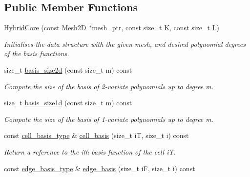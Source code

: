 \subsection*{Public Member Functions}
\begin{DoxyCompactItemize}
\item 
\hyperlink{classHArDCore2D_1_1HybridCore_a77e1aad579b2b484f068790d546a8d77}{Hybrid\+Core} (const \hyperlink{classHArDCore2D_1_1Mesh2D}{Mesh2D} $\ast$mesh\+\_\+ptr, const size\+\_\+t \hyperlink{classHArDCore2D_1_1HybridCore_a74242d0a8b68fe5d9a35c6eb0effe3b2}{K}, const size\+\_\+t \hyperlink{classHArDCore2D_1_1HybridCore_af5aea2e23e91c582d8c8189a5bc7ae96}{L})
\begin{DoxyCompactList}\small\item\em Initialises the data structure with the given mesh, and desired polynomial degrees of the basis functions. \end{DoxyCompactList}\item 
size\+\_\+t \hyperlink{classHArDCore2D_1_1HybridCore_a09aabd37f36e11bbcfffbb5bb59e54d2}{basis\+\_\+size2d} (const size\+\_\+t m) const
\begin{DoxyCompactList}\small\item\em Compute the size of the basis of 2-\/variate polynomials up to degree m. \end{DoxyCompactList}\item 
size\+\_\+t \hyperlink{classHArDCore2D_1_1HybridCore_a9b648f5564d57e4c8cfcb277abfe8adf}{basis\+\_\+size1d} (const size\+\_\+t m) const
\begin{DoxyCompactList}\small\item\em Compute the size of the basis of 1-\/variate polynomials up to degree m. \end{DoxyCompactList}\item 
const \hyperlink{classHArDCore2D_1_1HybridCore_a4b9c53f6ec13dc9e73f5cdc5c8ae782b}{cell\+\_\+basis\+\_\+type} \& \hyperlink{classHArDCore2D_1_1HybridCore_a34242db07cc2b3c3b867d9e4580b634d}{cell\+\_\+basis} (size\+\_\+t iT, size\+\_\+t i) const
\begin{DoxyCompactList}\small\item\em Return a reference to the i\textquotesingle{}th basis function of the cell iT. \end{DoxyCompactList}\item 
const \hyperlink{classHArDCore2D_1_1HybridCore_a1f2030ea16722179fd3523e6e6675948}{edge\+\_\+basis\+\_\+type} \& \hyperlink{classHArDCore2D_1_1HybridCore_a6b4feaeef7739a2e30fcf6c601fcf721}{edge\+\_\+basis} (size\+\_\+t iF, size\+\_\+t i) const

\end{DoxyCompactItemize}
